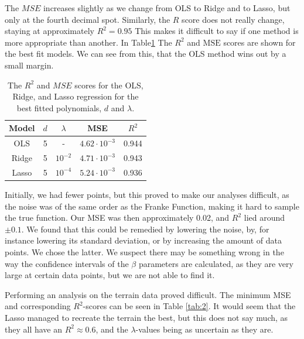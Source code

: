 \documentclass[a4paper,10pt,english]{article}
\begin{document}
The $MSE$ increases slightly as we change from OLS to Ridge and to Lasso, but only at the fourth decimal spot. Similarly, the $R$ score does not really change, staying at approximately $R^2=0.95$ This makes it difficult to say if one method is more appropriate than another.
In Table\ref{tab:1} The $R^2$ and $\mathrm{MSE}$ scores are shown for the best fit models. We can see from this, that the OLS method wins out by a small margin.
\begin{table}[t]
	\centering
	\begin{threeparttable}
		\centering
		\caption{The $R^2$ and $MSE$ scores for the OLS, Ridge, and Lasso regression for the best fitted polynomials, $d$ and $\lambda$.}
		\label{tab:1}
		\begin{tabular}{ccccc}
			\toprule\toprule
			Model & $d$ & $\lambda$ & MSE & $R^2$\\
			\midrule
			OLS			& 5 	& - 	&$4.62\cdot10^{-3}$ & 0.944\\
			Ridge		& 5 	& $10^{-2}$ &$4.71\cdot10^{-3}$ &0.943 \\
			Lasso		& 5 	&$10^{-4}$ & $ 5.24\cdot10^{-3}$ &0.936\\
			\bottomrule\bottomrule
		\end{tabular}
	\end{threeparttable}
\end{table}

Initially, we had fewer points, but this proved to make our analyses difficult, as the noise was of the same order as the Franke Function, making it hard to sample the true function. Our MSE was then approximately 0.02, and $R^2$ lied around $\pm0.1$. 
We found that this could be remedied by lowering the noise, by, for instance lowering its standard deviation, or by increasing the amount of data points. We chose the latter. We suspect there may be something wrong in the way the confidence intervals of the $\beta$ parameters are calculated, as they are very large at certain data points, but we are not able to find it.

Performing an analysis on the terrain data proved difficult. The minimum MSE and corresponding $R^2$-scores can be seen in Table \ref{tab:2}. It would seem that the Lasso managed to recreate the terrain the best, but this does not say much, as they all have an $R^2\approx0.6$, and the $\lambda$-values being as uncertain as they are.
\end{document}
